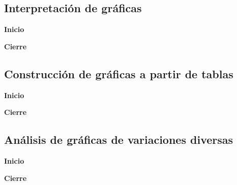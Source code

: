 \documentclass[11pt]{book}
\begin{document}
\subsection{Interpretación de gr\'aficas}

\begin{boxK}
    \begin{center}\textbf{Inicio}\end{center}

\end{boxK}

\begin{boxK}
    \begin{center}\textbf{Cierre}\end{center}

\end{boxK}

\subsection{Construcción de gr\'aficas a partir de tablas}

\begin{boxK}
    \begin{center}\textbf{Inicio}\end{center}

\end{boxK}

\begin{boxK}
    \begin{center}\textbf{Cierre}\end{center}

\end{boxK}

\subsection{Análisis de gr\'aficas de variaciones diversas}

\begin{boxK}
    \begin{center}\textbf{Inicio}\end{center}

\end{boxK}

\begin{boxK}
    \begin{center}\textbf{Cierre}\end{center}

\end{boxK}
\end{document}

